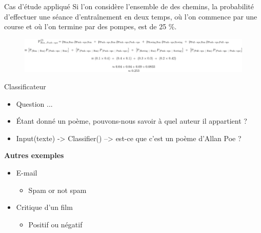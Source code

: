 \documentclass[aspectratio=169,xcolor=dvipsnames, t]{beamer}
\begin{document}
\begin{frame}{Cas d'étude appliqué}
	Si l'on considère l'ensemble de des chemins, la probabilité d'effectuer une séance d'entraînement en deux temps, où l'on commence par une course et où l'on termine par des pompes, est de 25 \%.
	
	\begin{figure}
		\includegraphics[height=0.25\paperheight]{figures/equiationiGeneral.png}
	\end{figure}
	
\end{frame}





\begin{frame}{Classificateur}
	\begin{itemize}
		\item Question ... 
		\item Étant donné un poème, pouvons-nous savoir à quel auteur il appartient ?
		\item Input(texte) -> Classifier() --> est-ce que c'est un poème d'Allan Poe ?
	\end{itemize}

	\vspace{0.5cm}
	
	\textbf{Autres exemples}	
	\begin{itemize}
		\item E-mail
		\begin{itemize}
			\item Spam or not spam
		\end{itemize}
		\item Critique d'un film
		\begin{itemize}
			\item Positif ou négatif 
		\end{itemize}
	\end{itemize}
	
\end{frame}
\end{document}
